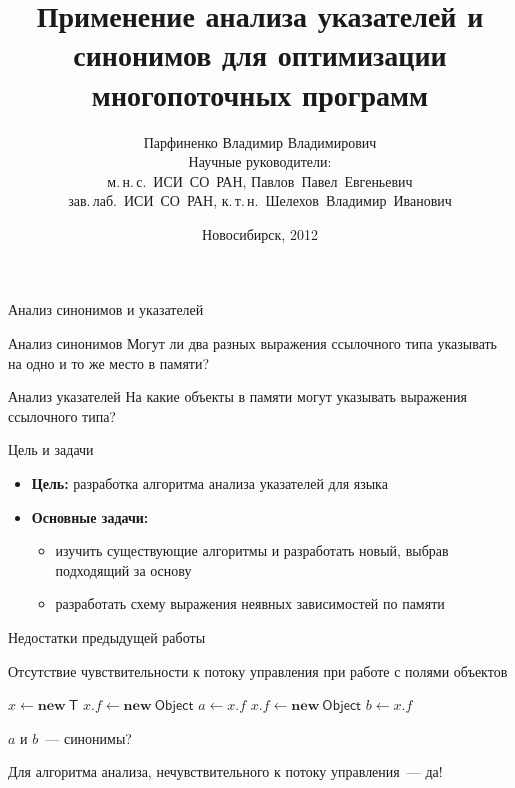 \documentclass[usenames,dvipsnames,pdftex,unicode,hidelinks]{beamer}
\title[Анализ указателей и синонимов]{
  Применение анализа указателей и синонимов
  для оптимизации многопоточных программ
}
\author[Парфиненко Владимир Владимирович]{
  Парфиненко Владимир Владимирович
  \texorpdfstring{%
    \\
    \vspace{0.5cm}
    \small
      Научные руководители:\\
      м.\,н.\,с.~ИСИ~СО~РАН, Павлов~Павел~Евгеньевич \\
      зав.\,лаб.~ИСИ~СО~РАН, к.\,т.\,н.~Шелехов~Владимир~Иванович
  }{}%
}
\institute{
  Новосибирский Национальный Исследовательский \\
  Государственный Университет
}
\date{
  Новосибирск, 2012\ifdraft{ \\\medskip \footnotesize Git date: \GitDate.}{}
}
\newcommand{\java}{\eng{Java}\xspace}
\newcommand{\type}[1]{\mathsf{#1}}
\newcommand{\op}[1]{\mathbf{#1}}
\begin{document}
\begin{frame}
  \titlepage
\end{frame}

\begin{frame}{Анализ синонимов и указателей}

  \begin{block}{Анализ синонимов }
    Могут ли два разных выражения ссылочного типа указывать на одно и то же
    место в памяти?
  \end{block}

  \begin{block}{Анализ указателей }
    На какие объекты в памяти могут указывать выражения ссылочного типа?
  \end{block}

\end{frame}

\begin{frame}{Цель и задачи}

  \begin{itemize}
    \item \textbf{Цель:}
          разработка алгоритма анализа указателей для языка \java
    \medskip
    \item \textbf{Основные задачи:}
      \begin{itemize}
        \item изучить существующие алгоритмы и разработать новый, выбрав
              подходящий за основу
        \item разработать схему выражения неявных зависимостей по памяти
      \end{itemize}
  \end{itemize}

\end{frame}

\begin{frame}{Недостатки предыдущей работы}

  \begin{block}{Отсутствие чувствительности к потоку управления при работе с
      полями объектов}
    \begin{algorithmic}[1]
      \State $x \gets \op{new}~\type{T}$
      \State $x.f \gets \op{new}~\type{Object}$
      \State $a \gets x.f$
      \State $x.f \gets \op{new}~\type{Object}$
      \State $b \gets x.f$
    \end{algorithmic}
  \end{block}

  \medskip
  \centerline{\large $a$ и $b$~--- синонимы?}
  \centerline{Для алгоритма анализа, нечувствительного к потоку управления~---
  да!}

\end{frame}
\end{document}
